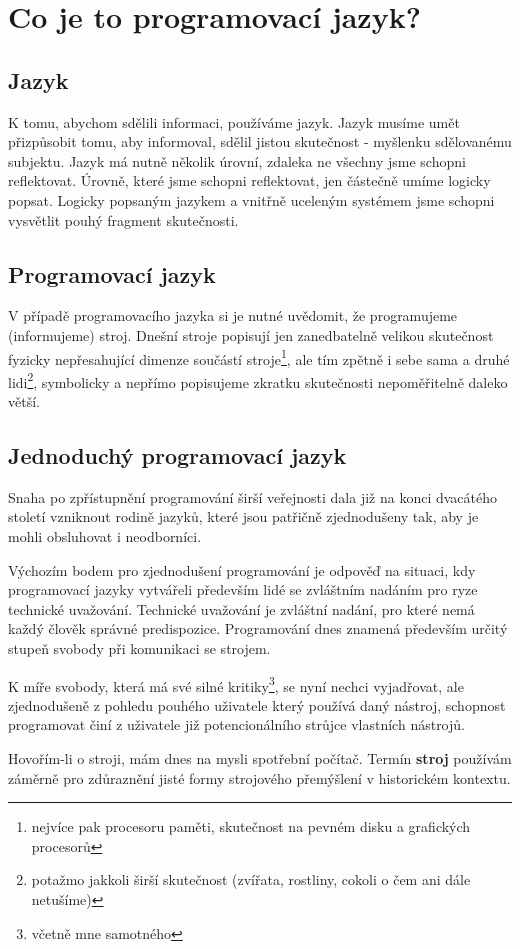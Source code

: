 \documentclass[10pt,twopage]{book}
\newcommand{\oddil}[1]{\section{#1}\label{sec:#1}}
\newcommand{\slovnik}[1]{\textbf{\gls{#1}}\index{#1}}
\begin{document}

\chapter{Co je to programovací jazyk?}

\oddil{Jazyk}

K tomu, abychom sdělili informaci, používáme jazyk. Jazyk musíme umět přizpůsobit tomu, aby informoval, sdělil jistou skutečnost - myšlenku sdělovanému subjektu. Jazyk má nutně několik úrovní, zdaleka ne všechny jsme schopni reflektovat. Úrovně, které jsme schopni reflektovat, jen částečně umíme logicky popsat. Logicky popsaným jazykem a vnitřně uceleným systémem jsme schopni vysvětlit pouhý fragment skutečnosti.


\oddil{Programovací jazyk}

V případě programovacího jazyka si je nutné uvědomit, že programujeme (informujeme) stroj. Dnešní stroje popisují jen zanedbatelně velikou skutečnost fyzicky nepřesahující dimenze součástí stroje\footnote{nejvíce pak procesoru paměti, skutečnost na pevném disku a grafických procesorů}, ale tím zpětně i sebe sama a druhé lidi\footnote{potažmo jakkoli širší skutečnost (zvířata, rostliny, cokoli o čem ani dále netušíme)}, symbolicky a nepřímo popisujeme zkratku skutečnosti nepoměřitelně daleko větší.



\oddil{Jednoduchý programovací jazyk}

Snaha po  zpřístupnění programování širší veřejnosti dala již na konci dvacátého století vzniknout rodině jazyků, které jsou patřičně zjednodušeny tak, aby je mohli obsluhovat i neodborníci.

Výchozím bodem pro zjednodušení programování je odpověď na situaci, kdy programovací jazyky vytvářeli především lidé se zvláštním nadáním pro ryze technické uvažování. Technické uvažování je zvláštní nadání, pro které nemá každý člověk správné predispozice. Programování dnes znamená především určitý stupeň svobody při komunikaci se strojem.

K míře svobody, která má své silné kritiky\footnote{včetně mne samotného}, se nyní nechci vyjadřovat, ale zjednodušeně z pohledu pouhého uživatele který používá daný nástroj, schopnost programovat činí z uživatele již potencionálního strůjce vlastních nástrojů.

Hovořím-li o stroji, mám dnes na mysli spotřební počítač. Termín \slovnik{stroj} používám záměrně pro zdůraznění jisté formy strojového přemýšlení v historickém kontextu.
\end{document}
